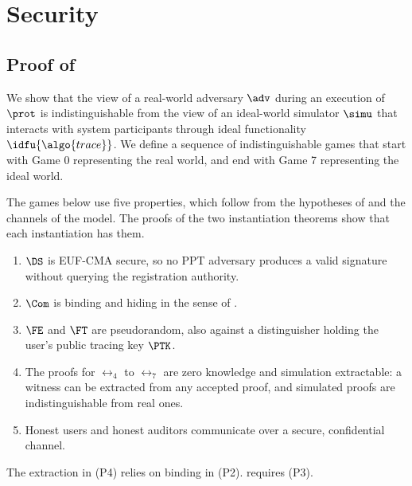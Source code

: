 \section{Security}\label{sec:txid-security}

\subsection{Proof of }\label{sec:txid-bb-sec}

We show that the view of a real-world adversary $\adv$ during an execution of
$\prot$ is indistinguishable from the view of an ideal-world simulator $\simu$
that interacts with system participants through ideal functionality
$\idfu{\algo{trace}}$. We define a sequence of indistinguishable games that
start with Game 0 representing the real world, and end with Game 7 representing
the ideal world.

The games below use five properties, which follow from the hypotheses of
 and the channels of the model. The proofs of the two
instantiation theorems show that each instantiation has them.

\begin{enumerate}

  \item[(P1)] $\DS$ is EUF-CMA secure, so no PPT adversary produces a valid
signature without querying the registration authority.

  \item[(P2)] $\Com$ is binding and hiding in the sense of
.

  \item[(P3)] $\FE$ and $\FT$ are pseudorandom, also against a distinguisher
holding the user's public tracing key $\PTK$.

  \item[(P4)] The proofs for $\rel_4$ to $\rel_7$ are zero knowledge and
simulation extractable: a witness can be extracted from any accepted proof, and
simulated proofs are indistinguishable from real ones.

  \item[(P5)] Honest users and honest auditors communicate over a secure,
confidential channel.

\end{enumerate}

The extraction in (P4) relies on binding in (P2). 
requires (P3).

